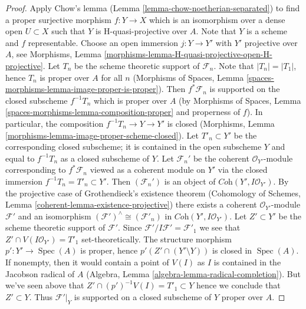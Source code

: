 \documentclass[10pt,a4paper]{amsart}
\theoremstyle{plain}
\theoremstyle{definition}
\theoremstyle{remark}
\numberwithin{equation}{subsection}
\def\Spec{\mathop{\mathrm{Spec}}}
\begin{document}
\begin{proof}
\medskip\noindent
Apply Chow's lemma (Lemma \ref{lemma-chow-noetherian-separated})
to find a proper surjective morphism $f : Y \to X$ which is an isomorphism
over a dense open $U \subset X$ such that $Y$ is H-quasi-projective
over $A$. Note that $Y$ is a scheme and $f$ representable.
Choose an open immersion $j : Y \to Y'$ with $Y'$ projective over $A$, see
Morphisms, Lemma \ref{morphisms-lemma-H-quasi-projective-open-H-projective}.
Let $T_n$ be the scheme theoretic support of $\mathcal{F}_n$.
Note that $|T_n| = |T_1|$, hence $T_n$ is proper over $A$ for all $n$
(Morphisms of Spaces, Lemma
\ref{spaces-morphisms-lemma-image-proper-is-proper}).
Then $f^*\mathcal{F}_n$ is supported on the closed subscheme
$f^{-1}T_n$ which is proper over $A$ (by
Morphisms of Spaces, Lemma \ref{spaces-morphisms-lemma-composition-proper}
and properness of $f$).
In particular, the composition $f^{-1}T_n \to Y \to Y'$ is closed
(Morphisms, Lemma \ref{morphisms-lemma-image-proper-scheme-closed}).
Let $T'_n \subset Y'$ be the corresponding closed subscheme;
it is contained in the open subscheme $Y$ and equal to $f^{-1}T_n$
as a closed subscheme of $Y$. Let $\mathcal{F}_n'$
be the coherent $\mathcal{O}_{Y'}$-module corresponding to
$f^*\mathcal{F}_n$ viewed as a coherent module on $Y'$ via
the closed immersion $f^{-1}T_n = T'_n \subset Y'$.
Then $(\mathcal{F}_n')$
is an object of $\textit{Coh}(Y', I\mathcal{O}_{Y'})$.
By the projective case of Grothendieck's existence theorem
(Cohomology of Schemes, Lemma \ref{coherent-lemma-existence-projective})
there exists a coherent $\mathcal{O}_{Y'}$-module
$\mathcal{F}'$ and an isomorphism
$(\mathcal{F}')^\wedge \cong (\mathcal{F}'_n)$ in
$\textit{Coh}(Y', I\mathcal{O}_{Y'})$.
Let $Z' \subset Y'$ be the scheme theoretic support of $\mathcal{F}'$.
Since $\mathcal{F}'/I\mathcal{F}' = \mathcal{F}'_1$ we see
that $Z' \cap V(I\mathcal{O}_{Y'}) = T'_1$ set-theoretically.
The structure morphism $p' : Y' \to \Spec(A)$ is proper, hence
$p'(Z' \cap (Y' \setminus Y))$ is closed in $\Spec(A)$.
If nonempty, then it would contain a point of $V(I)$
as $I$ is contained in the Jacobson radical of $A$
(Algebra, Lemma \ref{algebra-lemma-radical-completion}).
But we've seen above that $Z' \cap (p')^{-1}V(I) = T'_1 \subset Y$
hence we conclude that $Z' \subset Y$. Thus $\mathcal{F}'|_Y$
is supported on a closed subscheme of $Y$ proper over $A$.


\end{proof}
\end{document}
